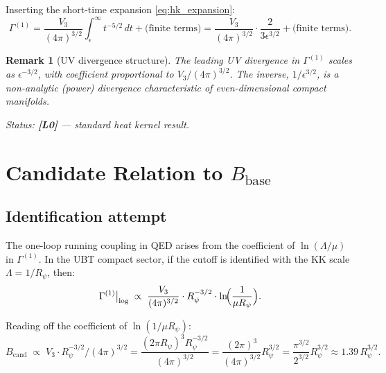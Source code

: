 \documentclass[11pt,a4paper]{article}
\newtheorem{remark}{Remark}
\begin{document}
Inserting the short-time expansion \eqref{eq:hk_expansion}:
\begin{equation}
\label{eq:gamma1_exp}
  \Gamma^{(1)}
  = \frac{V_3}{(4\pi)^{3/2}}\int_\epsilon^\infty t^{-5/2}\, dt
  + \text{(finite terms)}
  = \frac{V_3}{(4\pi)^{3/2}}\cdot \frac{2}{3\epsilon^{3/2}}
  + \text{(finite terms)}.
\end{equation}

\begin{remark}[UV divergence structure]
  The leading UV divergence in $\Gamma^{(1)}$ scales as
  $\epsilon^{-3/2}$, with coefficient proportional to $V_3/(4\pi)^{3/2}$.
  The inverse, $1/\epsilon^{3/2}$, is a non-analytic (power) divergence
  characteristic of even-dimensional compact manifolds.

  Status: \textbf{[L0]} — standard heat kernel result.
\end{remark}

\section{Candidate Relation to \texorpdfstring{$B_{\mathrm{base}}$}{B\_base}}
\label{sec:candidate}

\subsection{Identification attempt}

The one-loop running coupling in QED arises from the coefficient of
$\ln(\Lambda/\mu)$ in $\Gamma^{(1)}$.  In the UBT compact sector, if the
cutoff is identified with the KK scale $\Lambda = 1/R_\psi$, then:
\begin{equation}
\label{eq:log_running}
  \Gamma^{(1)}\big|_{\log}
  \;\propto\; \frac{V_3}{(4\pi)^{3/2}}\cdot R_\psi^{-3/2}
  \cdot \ln\!\Bigl(\frac{1}{\mu R_\psi}\Bigr).
\end{equation}

Reading off the coefficient of $\ln(1/\mu R_\psi)$:
\begin{equation}
\label{eq:b_candidate}
  B_{\mathrm{cand}} \;\propto\; V_3 \cdot R_\psi^{-3/2}/(4\pi)^{3/2}
  = \frac{(2\pi R_\psi)^3 R_\psi^{-3/2}}{(4\pi)^{3/2}}
  = \frac{(2\pi)^3}{(4\pi)^{3/2}} R_\psi^{3/2}
  = \frac{\pi^{3/2}}{2^{3/2}} R_\psi^{3/2}
  \approx 1.39\, R_\psi^{3/2}.
\end{equation}
\end{document}
